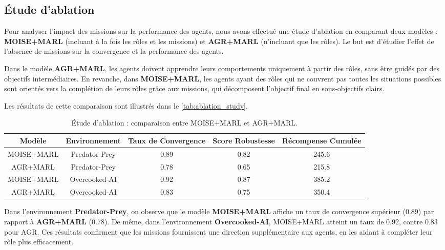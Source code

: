 \documentclass[sigconf,anonymous]{aamas}
\begin{document}
\subsection{Étude d'ablation}

Pour analyser l'impact des missions sur la performance des agents, nous avons effectué une étude d'ablation en comparant deux modèles : \textbf{MOISE+MARL} (incluant à la fois les rôles et les missions) et \textbf{AGR+MARL} (n'incluant que les rôles). Le but est d'étudier l'effet de l'absence de missions sur la convergence et la performance des agents.

Dans le modèle \textbf{AGR+MARL}, les agents doivent apprendre leurs comportements uniquement à partir des rôles, sans être guidés par des objectifs intermédiaires. En revanche, dans \textbf{MOISE+MARL}, les agents ayant des rôles qui ne couvrent pas toutes les situations possibles sont orientés vers la complétion de leurs rôles grâce aux missions, qui décomposent l'objectif final en sous-objectifs clairs.

Les résultats de cette comparaison sont illustrés dans le \autoref{tab:ablation_study}.

\begin{table*}[h!]
    \centering
    \caption{Étude d'ablation : comparaison entre MOISE+MARL et AGR+MARL.}
    \label{tab:ablation_study}
    \begin{tabular}{|c|c|c|c|c|}
        \hline
        \textbf{Modèle} & \textbf{Environnement} & \textbf{Taux de Convergence} & \textbf{Score Robustesse} & \textbf{Récompense Cumulée} \\ \hline
        MOISE+MARL & Predator-Prey & 0.89 & 0.82 & 245.6 \\ \hline
        AGR+MARL & Predator-Prey & 0.78 & 0.65 & 215.8 \\ \hline
        MOISE+MARL & Overcooked-AI & 0.92 & 0.87 & 385.2 \\ \hline
        AGR+MARL & Overcooked-AI & 0.83 & 0.75 & 350.4 \\ \hline
    \end{tabular}
\end{table*}

Dans l'environnement \textbf{Predator-Prey}, on observe que le modèle \textbf{MOISE+MARL} affiche un taux de convergence supérieur (0.89) par rapport à \textbf{AGR+MARL} (0.78). De même, dans l'environnement \textbf{Overcooked-AI}, MOISE+MARL atteint un taux de 0.92, contre 0.83 pour AGR. Ces résultats confirment que les missions fournissent une direction supplémentaire aux agents, en les aidant à compléter leur rôle plus efficacement.
\end{document}
